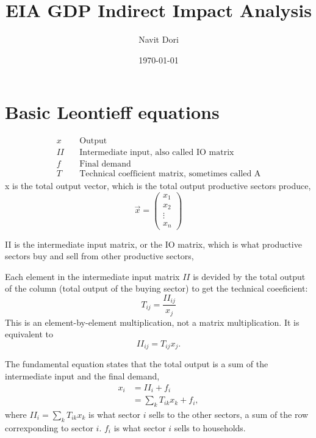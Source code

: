 \documentclass[12pt]{article}
\title{EIA GDP Indirect Impact Analysis}
\author{Navit Dori}
\date{\today}
\begin{document}
\maketitle


\section{Basic Leontieff equations}

\begin{equation}
\begin{array}{ll}  %
    x   & \quad \text{Output} \\
   II   & \quad \text{Intermediate input, also called IO matrix} \\
    f    & \quad \text{Final demand} \\
    T   & \quad \text{Technical coefficient matrix, sometimes called A} 
\end{array}
\end{equation}
x is the total output vector, which is the total output productive sectors produce,
\[
\vec{x} =
\begin{pmatrix}
x_1 \\
x_2 \\
\vdots \\
x_n
\end{pmatrix}
\]

II is the intermediate input matrix, or the IO matrix, which is what productive sectors buy and sell from other productive sectors,

Each element in the intermediate input matrix $II$ is devided by the total output of the column (total output of the buying sector) to get the technical coeeficient:
\begin{equation}\label{eq:Tdef}
T_{ij} = \frac{II_{ij}}{x_j}
\end{equation}
This is an element-by-element multiplication, not a matrix multiplication. It is equivalent to
\begin{equation}
II_{ij} = T_{ij}x_j.
\end{equation}


The fundamental equation states that the total output is a sum of the intermediate input and the final demand,
\begin{equation}
\begin{aligned}
    x_i &= II_i+f_i \\
         &= \sum_k {T_{ik} x_k} + f_i, 
\end{aligned}
\end{equation}
where $II_i=\sum_k{T_{ik}x_k}$ is what sector $i$ sells to the other sectors, a sum of the row correxponding to sector $i$.  $f_i$ is what sector $i$ sells to households.
\end{document}

